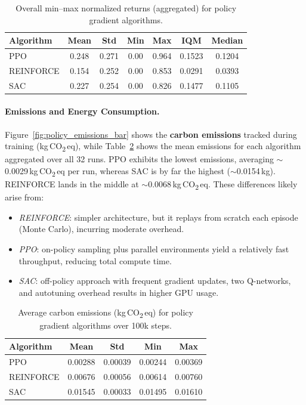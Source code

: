 \begin{table} 
	\centering
	\caption{Overall min--max normalized returns (aggregated) for policy gradient algorithms.}
	\label{tab:policy_final_eval_minmax}
	\begin{tabular}{lcccccc}
		\toprule
		\textbf{Algorithm} & \textbf{Mean} & \textbf{Std} & \textbf{Min} & \textbf{Max} & \textbf{IQM} & \textbf{Median} \\
		\midrule
		PPO         & 0.248 & 0.271 & 0.00 & 0.964 & 0.1523 & 0.1204 \\
		REINFORCE   & 0.154 & 0.252 & 0.00 & 0.853 & 0.0291 & 0.0393 \\
		SAC         & 0.227 & 0.254 & 0.00 & 0.826 & 0.1477 & 0.1105 \\
		\bottomrule
	\end{tabular}
\end{table}

\paragraph{Emissions and Energy Consumption.}
Figure~\ref{fig:policy_emissions_bar} shows the \textbf{carbon emissions} tracked during training (kg\,CO\textsubscript{2}\,eq), while Table~\ref{tab:policy_emissions} shows the mean emissions for each algorithm aggregated over all 32 runs. PPO exhibits the lowest emissions, averaging $\sim$\num{0.0029}\,kg\,CO\textsubscript{2}\,eq per run, whereas SAC is by far the highest ($\sim$\num{0.0154}\,kg). REINFORCE lands in the middle at $\sim$\num{0.0068}\,kg\,CO\textsubscript{2}\,eq. These differences likely arise from:
\begin{itemize}
	\item \emph{REINFORCE}: simpler architecture, but it replays from scratch each episode (Monte Carlo), incurring moderate overhead.  
	\item \emph{PPO}: on-policy sampling plus parallel environments yield a relatively fast throughput, reducing total compute time.  
	\item \emph{SAC}: off-policy approach with frequent gradient updates, two Q-networks, and autotuning overhead results in higher GPU usage.
\end{itemize}

\begin{table} 
	\centering
	\caption{Average carbon emissions (kg\,CO\textsubscript{2}\,eq) for policy gradient algorithms over 100k steps.}
	\label{tab:policy_emissions}
	\begin{tabular}{lcccc}
		\toprule
		\textbf{Algorithm} & \textbf{Mean} & \textbf{Std} & \textbf{Min} & \textbf{Max} \\
		\midrule
		PPO         & 0.00288 & 0.00039 & 0.00244 & 0.00369 \\
		REINFORCE   & 0.00676 & 0.00056 & 0.00614 & 0.00760 \\
		SAC         & 0.01545 & 0.00033 & 0.01495 & 0.01610 \\
		\bottomrule
	\end{tabular}
\end{table}

